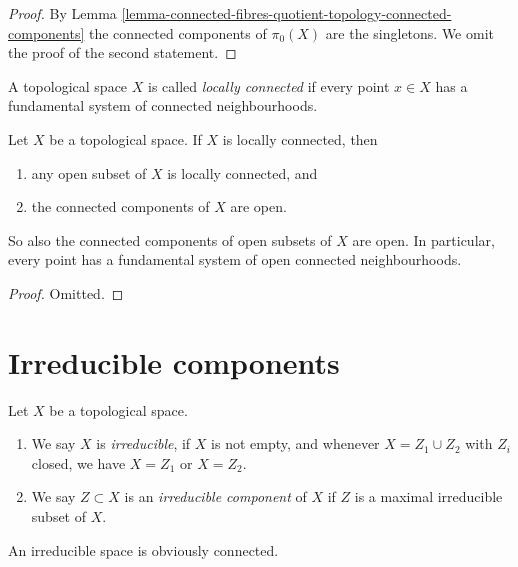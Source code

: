 \begin{proof}
By Lemma
\ref{lemma-connected-fibres-quotient-topology-connected-components}
the connected components of $\pi_0(X)$ are the singletons.
We omit the proof of the second statement.
\end{proof}

\begin{definition}
\label{definition-locally-connected}
A topological space $X$ is called {\it locally connected} if
every point $x \in X$ has a fundamental system of connected neighbourhoods.
\end{definition}

\begin{lemma}
\label{lemma-locally-connected}
Let $X$ be a topological space. If $X$ is locally connected, then
\begin{enumerate}
\item any open subset of $X$ is locally connected, and
\item the connected components of $X$ are open.
\end{enumerate}
So also the connected components of open subsets of $X$ are open.
In particular, every point has a fundamental system of open connected
neighbourhoods.
\end{lemma}

\begin{proof}
Omitted.
\end{proof}




\section{Irreducible components}
\label{section-irreducible-components}

\begin{definition}
\label{definition-irreducible-components}
Let $X$ be a topological space.
\begin{enumerate}
\item We say $X$ is {\it irreducible}, if $X$ is not empty, and whenever
$X = Z_1 \cup Z_2$ with $Z_i$ closed, we have $X = Z_1$ or $X = Z_2$.
\item We say $Z \subset X$ is an {\it irreducible component} of $X$
if $Z$ is a maximal irreducible subset of $X$.
\end{enumerate}
\end{definition}

\noindent
An irreducible space is obviously connected.


